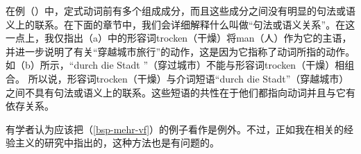 \noindent
在例（）中，定式动词前有多个组成成分，而且这些成分之间没有明显的句法或语义上的联系。在下面的章节中，我们会详细解释什么叫做“句法或语义关系”。在这一点上，我仅指出（a）中的形容词trocken（干燥）将man（人）作为它的主语，并进一步说明了有关“穿越城市旅行”的动作，这是因为它指称了动词所指的动作。如（b）所示，“durch die Stadt ”（穿过城市）不能与形容词trocken（干燥）相组合。
\eal
{}
\zl
所以说，形容词trocken（干燥）与介词短语“durch die Stadt”（穿越城市）之间不具有句法或语义上的联系。这些短语的共性在于他们都指向动词并且与它有依存关系。

有学者认为应该把（\ref{bsp-mehr-vf}）的例子看作是例外。不过，正如我在相关的经验主义的研究中指出的，这种方法也是有问题的\citep{Mueller2003b}。

